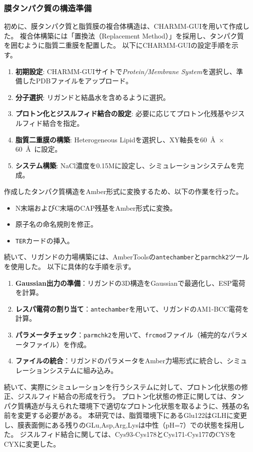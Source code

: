 \subsubsection{膜タンパク質の構造準備}
初めに、膜タンパク質と脂質膜の複合体構造は、CHARMM-GUIを用いて作成した。
複合体構築には「置換法（Replacement Method）」を採用し、タンパク質を囲むように脂質二重膜を配置した。
以下にCHARMM-GUIの設定手順を示す。
\begin{enumerate}
    \item \textbf{初期設定}: CHARMM-GUIサイトで\textit{Protein/Membrane System}を選択し、準備したPDBファイルをアップロード。
    \item \textbf{分子選択}: リガンドと結晶水を含めるように選択。
    \item \textbf{プロトン化とジスルフィド結合の設定}: 必要に応じてプロトン化残基やジスルフィド結合を指定。
    \item \textbf{脂質二重膜の構築}: Heterogeneous Lipidを選択し、XY軸長を60~\AA\ $\times$ 60~\AA\ に設定。
    \item \textbf{システム構築}: NaCl濃度を0.15Mに設定し、シミュレーションシステムを完成。
\end{enumerate}
作成したタンパク質構造をAmber形式に変換するため、以下の作業を行った。
\begin{itemize}
    \item N末端およびC末端のCAP残基をAmber形式に変換。
    \item 原子名の命名規則を修正。
    \item \texttt{TER}カードの挿入。
\end{itemize}

続いて、リガンドの力場構築には、AmberToolsの\texttt{antechamber}と\texttt{parmchk2}ツールを使用した。
以下に具体的な手順を示す。
\begin{enumerate}
    \item \textbf{Gaussian出力の準備}：リガンドの3D構造をGaussianで最適化し、ESP電荷を計算。
    \item \textbf{レスパ電荷の割り当て}：\texttt{antechamber}を用いて、リガンドのAM1-BCC電荷を計算。
    \item \textbf{パラメータチェック}：\texttt{parmchk2}を用いて、\texttt{frcmod}ファイル（補完的なパラメータファイル）を作成。
    \item \textbf{ファイルの統合}：リガンドのパラメータをAmber力場形式に統合し、シミュレーションシステムに組み込み。
\end{enumerate}

続いて、実際にシミュレーションを行うシステムに対して、プロトン化状態の修正、ジスルフィド結合の形成を行う。
プロトン化状態の修正に関しては、タンパク質構造が与えられた環境下で適切なプロトン化状態を取るように、残基の名前を変更する必要がある。
本研究では、脂質環境下にあるGlu122はGLHに変更し、膜表面側にある残りのGLu,Asp,Arg,Lysは中性（pH=7）での状態を採用した。
ジスルフィド結合に関しては、Cys93-Cys178とCys171-Cys177のCYSをCYXに変更した。

